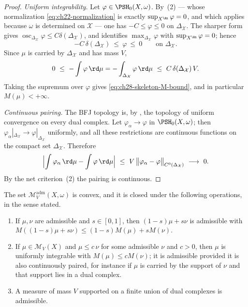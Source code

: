 \begin{proof}
\emph{Uniform integrability.}  Let \(\varphi\in\PSH_0(X,\omega)\).  By
\,(2) --- whose normalization
\eqref{eq:ch22-normalization} is exactly
\(\sup_{X^{\An}}\varphi=0\), and which applies because \(\omega\) is
determined on \(\mathcal X\) --- one has \(-C\leq\varphi\leq0\) on
\(\Delta_{\mathcal X}\).  The sharper form
 gives
\(\operatorname{osc}_{\Delta_{\mathcal X}}\varphi\leq
C\delta(\Delta_{\mathcal X})\), and
 identifies
\(\max_{\Delta_{\mathcal X}}\varphi\) with
\(\sup_{X^{\An}}\varphi=0\); hence
\[
 -C\,\delta(\Delta_{\mathcal X})\ \leq\ \varphi\ \leq\ 0
 \qquad\text{on }\Delta_{\mathcal X}.
\]
Since \(\mu\) is carried by \(\Delta_{\mathcal X}\) and has mass \(V\),
\[
 0\ \leq\ -\int\varphi\,\rd\mu
 =-\int_{\Delta_{\mathcal X}}\varphi\,\rd\mu
 \ \leq\ C\,\delta(\Delta_{\mathcal X})\,V .
\]
Taking the supremum over \(\varphi\) gives
\eqref{eq:ch28-skeleton-M-bound}, and in particular \(M(\mu)<+\infty\).

\emph{Continuous pairing.}  The BFJ topology is, by
, the topology of uniform convergence on
every dual complex.  Let \(\varphi_\alpha\to\varphi\) in
\(\PSH_0(X,\omega)\); then
\(\varphi_\alpha|_{\Delta_{\mathcal X}}\to\varphi|_{\Delta_{\mathcal X}}\)
uniformly, and all these restrictions are continuous functions on the
compact set \(\Delta_{\mathcal X}\).  Therefore
\[
 \Bigl|\int\varphi_\alpha\,\rd\mu-\int\varphi\,\rd\mu\Bigr|
 \ \leq\ V\,\bigl\lVert
   \varphi_\alpha-\varphi\bigr\rVert_{C^0(\Delta_{\mathcal X})}
 \ \longrightarrow\ 0 .
\]
By the net criterion \,(2) the pairing is
continuous.
\end{proof}

\begin{proposition}
\label{prop:ch28-admissible-calculus}
The set \(\mathcal M^{\mathrm{adm}}_V(X,\omega)\) is convex, and it is
closed under the following operations, in the sense stated.
\begin{enumerate}
\item\label{itm:ch28-admcalc:convex}
 If \(\mu,\nu\) are admissible and \(s\in[0,1]\), then
 \((1-s)\mu+s\nu\) is admissible with
 \(M((1-s)\mu+s\nu)\leq(1-s)M(\mu)+sM(\nu)\).
\item\label{itm:ch28-admcalc:dominated}
 If \(\mu\in\mathcal M_V(X)\) and \(\mu\leq c\,\nu\) for some admissible
 \(\nu\) and \(c>0\), then \(\mu\) is uniformly integrable with
 \(M(\mu)\leq cM(\nu)\); it is admissible provided it is also continuously
 paired, for instance if \(\mu\) is carried by the support of \(\nu\) and
 that support lies in a dual complex.
\item\label{itm:ch28-admcalc:union}
 A measure of mass \(V\) supported on a finite union of dual complexes is
 admissible.
\end{enumerate}
\end{proposition}

